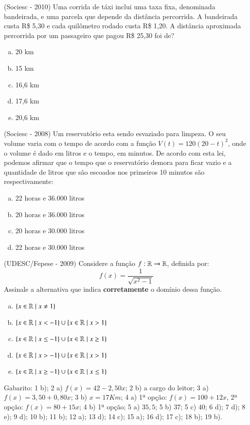   \begin{exer}
  (Sociesc - 2010) Uma corrida de táxi inclui uma taxa fixa, denominada bandeirada, e uma parcela que depende da distância percorrida. A bandeirada custa R\$ 5,30 e cada quilômetro rodado custa R\$ 1,20. A distância aproximada percorrida por um passageiro que pagou R\$ 25,30 foi de?
  \begin{enumerate}[a)]
  \item 20 km
  \item 15 km
  \item 16,6 km
  \item 17,6 km
  \item 20,6 km
 \end{enumerate}
  \end{exer}
  
  \begin{exer}
  (Sociesc - 2008) Um reservatório esta sendo esvaziado para limpeza. O seu volume varia com o tempo de acordo com a função $V(t)= 120(20 - t)^2$, onde o volume é dado em litros e o tempo, em minutos. De acordo com esta lei, podemos afirmar que o tempo que o reservatório demora para ficar vazio e a quantidade de litros que são escoados nos primeiros 10 minutos são respectivamente:
  \begin{enumerate}[a)]
  \item 22 horas e 36.000 litros
  \item 20 horas e 36.000 litros
  \item 20 horas e 30.000 litros
  \item 22 horas e 30.000 litros
 \end{enumerate}
  \end{exer}
  
  \begin{exer}
  (UDESC/Fepese - 2009) Considere a função $f: \mathbb{R} \to \mathbb{R}$, definida por:
 \[f(x)= \frac{1}{\sqrt{x^2 - 1}}\]
 Assinale a alternativa que indica \textbf{corretamente} o domínio dessa função.
 \begin{enumerate}[a)]
 \item $\{x \in \mathbb{R} \mid x \neq 1\}$
 \item $\{x \in \mathbb{R} \mid x < -1\} \cup \{x \in \mathbb{R} \mid x>1\}$
 \item $\{x \in \mathbb{R} \mid x \leq -1\} \cup \{x \in \mathbb{R} \mid x \geq 1\}$
 \item $\{x \in \mathbb{R} \mid x > -1\} \cup \{x \in \mathbb{R} \mid x>1\}$
 \item $\{x \in \mathbb{R} \mid x \geq -1\} \cup \{x \in \mathbb{R} \mid x\leq 1\}$
 \end{enumerate}
  \end{exer}
 
 
 Gabarito: 1 b); 2 a) $f(x)= 42 - 2,50 x$; 2 b) a cargo do leitor; 3 a) $f(x)= 3,50 + 0,80 x$; 3 b) $x= 17 Km$; 4 a) 1ª opção: $f(x)= 100 + 12x$, 2ª opção: $f(x)= 80+15x$; 4 b) 1ª opção; 5 a) $35,5$; 5 b) $37$; 5 c) $40$; 6 d); 7 d); 8 e); 9 d); 10 b); 11 b); 12 a); 13 d); 14 c); 15 a); 16 d); 17 c); 18 b); 19 b).
  


 